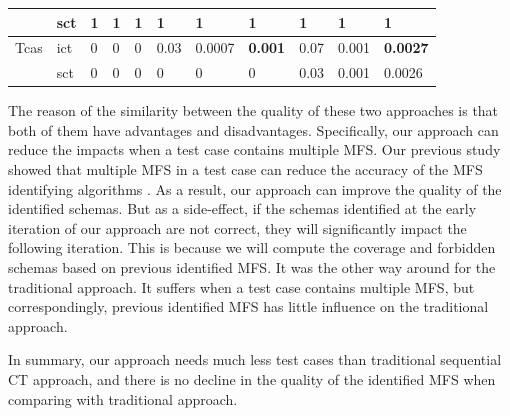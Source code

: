 \documentclass{sig-alternate}
\begin{document}
\begin{table}[htbp]
\begin{tabular}{|ll|lll|lll|lll|}
                         & sct                   & 1       & 1      & 1        & 1       & 1      & 1         & 1       & 1      & 1           \\ \hline
Tcas                     & ict                    & 0       & 0      & 0          & 0.03    & 0.0007 & \textbf{0.001  }  & 0.07    & 0.001  &\textbf{ 0.0027 }     \\
                         & sct                    & 0       & 0      & 0         & 0       & 0      & 0         & 0.03    & 0.001  & 0.0026 \\ \hline
\end{tabular}
\end{table}




The reason of the similarity between the quality of these two approaches is that both of them have advantages and disadvantages. Specifically, our approach can reduce the impacts when a test case contains multiple MFS. Our previous study showed that multiple MFS in a test case can reduce the accuracy of the MFS identifying algorithms \cite{niu2013identifying}. As a result, our approach can improve the quality of the identified schemas. But as a side-effect, if the schemas identified at the early iteration of our approach are not correct, they will significantly impact the following iteration. This is because we will compute the coverage and  forbidden schemas based on previous identified MFS.  It was the other way around for the traditional approach. It suffers when a test case contains multiple MFS, but correspondingly, previous identified MFS has little influence on the traditional approach.


In summary, our approach needs much less test cases than traditional sequential CT approach, and there is no decline in the quality of the identified MFS when comparing with traditional approach.

%
%
%
\end{document}
